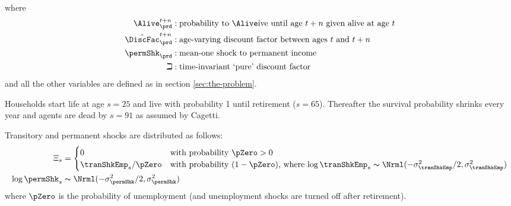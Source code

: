 \documentclass[titlepage, headings=optiontotocandhead]{econtex}
\begin{document}
where
  \begin{equation*}\begin{gathered}\begin{aligned}
        \Alive _{\prd}^{t+n} &:\text{probability to }\Alive\text{ive until age $t+n$ given alive at age $t$}
        \\      \hat{\DiscFac}_{\prd}^{t+n} &:\text{age-varying discount factor between ages $t$ and $t+n$}
        \\     \permShk_{\prd} &:\text{mean-one shock to permanent income}
        \\     \beth &:\text{time-invariant `pure' discount factor}
      \end{aligned}\end{gathered}\end{equation*}
and all the other variables are defined as in section \ref{sec:the-problem}.

Households start life at age $s=25$ and live with probability 1 until retirement
($s=65$). Thereafter the survival probability shrinks every year and
agents are dead by $s=91$ as assumed by Cagetti. %

  Transitory and permanent shocks are distributed as follows:
  \begin{equation}\begin{gathered}\begin{aligned}
        \Xi_{s} & =
        \begin{cases}
          0\phantom{/\pZero} & \text{with probability $\pZero>0$} \\
          \tranShkEmp_{s}/\pZero      & \text{with probability $(1-\pZero)$, where $\log \tranShkEmp_{s}\thicksim \Nrml(-\sigma_{\tranShkEmp}^{2}/2,\sigma_{\tranShkEmp}^{2})$}\\
        \end{cases}\\
        \log \permShk_{s} &\thicksim \Nrml(-\sigma_{\permShk}^{2}/2,\sigma_{\permShk}^{2})
      \end{aligned}\end{gathered}\end{equation}
  where $\pZero$ is the probability of unemployment (and unemployment shocks are turned off after retirement).
\end{document}
